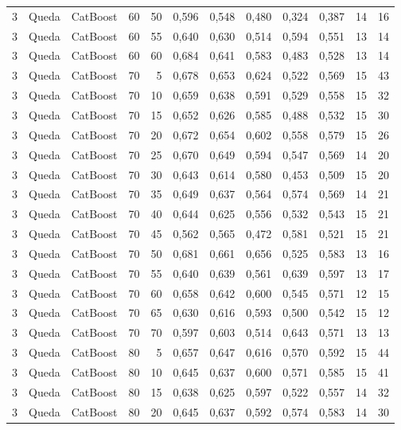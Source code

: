 \begin{longtable}{@{}rllrrrrrrrrr@{}}
3 & Queda & CatBoost & 60 & 50 & 0,596 & 0,548 & 0,480 & 0,324 & 0,387 & 14 & 16 \\
3 & Queda & CatBoost & 60 & 55 & 0,640 & 0,630 & 0,514 & 0,594 & 0,551 & 13 & 14 \\
3 & Queda & CatBoost & 60 & 60 & 0,684 & 0,641 & 0,583 & 0,483 & 0,528 & 13 & 14 \\
3 & Queda & CatBoost & 70 & 5 & 0,678 & 0,653 & 0,624 & 0,522 & 0,569 & 15 & 43 \\
3 & Queda & CatBoost & 70 & 10 & 0,659 & 0,638 & 0,591 & 0,529 & 0,558 & 15 & 32 \\
3 & Queda & CatBoost & 70 & 15 & 0,652 & 0,626 & 0,585 & 0,488 & 0,532 & 15 & 30 \\
3 & Queda & CatBoost & 70 & 20 & 0,672 & 0,654 & 0,602 & 0,558 & 0,579 & 15 & 26 \\
3 & Queda & CatBoost & 70 & 25 & 0,670 & 0,649 & 0,594 & 0,547 & 0,569 & 14 & 20 \\
3 & Queda & CatBoost & 70 & 30 & 0,643 & 0,614 & 0,580 & 0,453 & 0,509 & 15 & 20 \\
3 & Queda & CatBoost & 70 & 35 & 0,649 & 0,637 & 0,564 & 0,574 & 0,569 & 14 & 21 \\
3 & Queda & CatBoost & 70 & 40 & 0,644 & 0,625 & 0,556 & 0,532 & 0,543 & 15 & 21 \\
3 & Queda & CatBoost & 70 & 45 & 0,562 & 0,565 & 0,472 & 0,581 & 0,521 & 15 & 21 \\
3 & Queda & CatBoost & 70 & 50 & 0,681 & 0,661 & 0,656 & 0,525 & 0,583 & 13 & 16 \\
3 & Queda & CatBoost & 70 & 55 & 0,640 & 0,639 & 0,561 & 0,639 & 0,597 & 13 & 17 \\
3 & Queda & CatBoost & 70 & 60 & 0,658 & 0,642 & 0,600 & 0,545 & 0,571 & 12 & 15 \\
3 & Queda & CatBoost & 70 & 65 & 0,630 & 0,616 & 0,593 & 0,500 & 0,542 & 15 & 12 \\
3 & Queda & CatBoost & 70 & 70 & 0,597 & 0,603 & 0,514 & 0,643 & 0,571 & 13 & 13 \\
3 & Queda & CatBoost & 80 & 5 & 0,657 & 0,647 & 0,616 & 0,570 & 0,592 & 15 & 44 \\
3 & Queda & CatBoost & 80 & 10 & 0,645 & 0,637 & 0,600 & 0,571 & 0,585 & 15 & 41 \\
3 & Queda & CatBoost & 80 & 15 & 0,638 & 0,625 & 0,597 & 0,522 & 0,557 & 14 & 32 \\
3 & Queda & CatBoost & 80 & 20 & 0,645 & 0,637 & 0,592 & 0,574 & 0,583 & 14 & 30 \\

\end{longtable}
